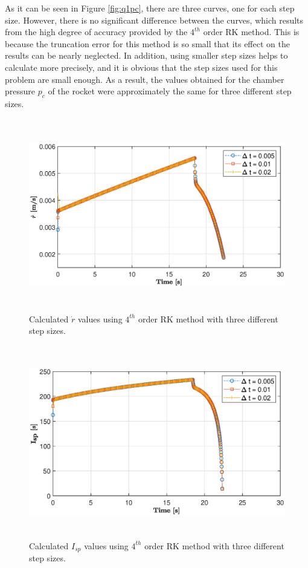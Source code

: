 \documentclass[letterpaper,12pt]{article}
\begin{document}
As it can be seen in Figure \ref{fig:q1pc}, there are three curves, one for each step size. However,
there is no significant difference between the curves, which results from the high degree of accuracy
provided by the $4^{th}$ order RK method. This is because the truncation error for this method is so
small that its effect on the results can be nearly neglected. In addition, using smaller step sizes
helps to calculate more precisely, and it is obvious that the step sizes used for this problem are small
enough. As a result, the values obtained for the chamber pressure $p_c$ of the rocket were approximately
the same for three different step sizes.

\newpage

\begin{figure} [!h]
	\centering
	\includegraphics[height = 8.4cm]{graphs/q1_rdot.eps}
	\caption{Calculated $\dot{r}$ values using $4^{th}$ order RK method with three different step sizes.}
	\label{fig:q1rdot}
\end{figure}

\begin{figure} [!h]
	\centering
	\includegraphics[height = 8.4cm]{graphs/q1_isp.eps}
	\caption{Calculated $I_{sp}$ values using $4^{th}$ order RK method with three different step sizes.}
	\label{fig:q1Isp}
\end{figure}
\end{document}
